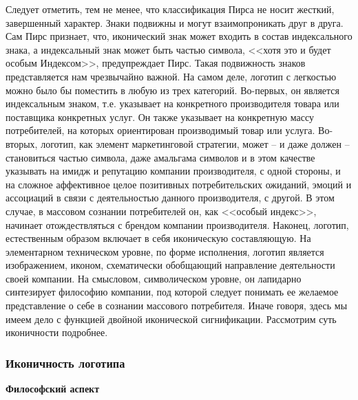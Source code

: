 Следует отметить, тем не менее, что классификация Пирса не носит жесткий,
завершенный характер. Знаки подвижны и могут взаимопроникать друг в друга.
Сам Пирс признает, что, иконический знак может входить в состав индексального
знака, а индексальный знак может быть частью символа, <<хотя это и будет особым
Индексом>>, предупреждает Пирс. Такая подвижность знаков представляется
нам чрезвычайно важной. На самом деле, логотип с легкостью можно было бы
поместить в любую из трех категорий. Во-первых, он является индексальным знаком,
т.е. указывает на конкретного производителя товара или поставщика конкретных
услуг. Он также указывает на конкретную массу потребителей, на которых
ориентирован производимый товар или услуга. Во-вторых, логотип, как
элемент маркетинговой стратегии, может -- и даже должен -- становиться частью
символа, даже амальгама символов и в этом качестве указывать на имидж и
репутацию компании производителя, с одной стороны, и на сложное аффективное
целое позитивных потребительских ожиданий, эмоций и ассоциаций в связи с
деятельностью данного производителя, с другой. В этом случае, в массовом
сознании потребителей он, как <<особый индекс>>, начинает отождествляться
с брендом компании производителя. Наконец, логотип, естественным образом
включает в себя иконическую составляющую. На элементарном техническом уровне,
по форме исполнения, логотип является изображением, иконом, схематически
обобщающий направление деятельности своей компании. На смысловом,
символическом уровне, он лапидарно синтезирует философию компании,
под которой следует понимать ее желаемое представление о себе в сознании
массового потребителя. Иначе говоря, здесь мы имеем дело с функцией двойной
иконической сигнификации. Рассмотрим суть иконичности подробнее.

\subsubsection{Иконичность логотипа}

\textbf{Философский аспект}

